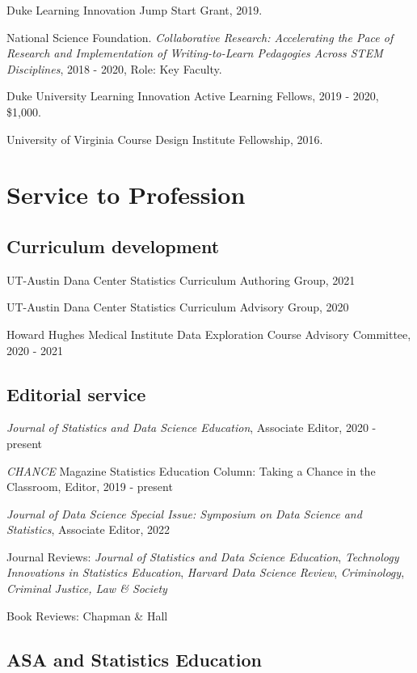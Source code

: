\documentclass[11pt,dvipsnames]{article}
\begin{document}
Duke Learning Innovation Jump Start Grant, 2019.

National Science Foundation. \emph{Collaborative Research: Accelerating
the Pace of Research and Implementation of Writing-to-Learn Pedagogies
Across STEM Disciplines}, 2018 - 2020, Role: Key Faculty.

Duke University Learning Innovation Active Learning Fellows, 2019 -
2020, \$1,000.

University of Virginia Course Design Institute Fellowship, 2016.

\section{Service to Profession}\label{service-to-profession}

\subsection{Curriculum development}\label{curriculum-development}

UT-Austin Dana Center Statistics Curriculum Authoring Group, 2021

UT-Austin Dana Center Statistics Curriculum Advisory Group, 2020

Howard Hughes Medical Institute Data Exploration Course Advisory
Committee, 2020 - 2021

\subsection{Editorial service}\label{editorial-service}

\emph{Journal of Statistics and Data Science Education}, Associate
Editor, 2020 - present

\emph{CHANCE} Magazine Statistics Education Column: Taking a Chance in
the Classroom, Editor, 2019 - present

\emph{Journal of Data Science Special Issue: Symposium on Data Science
and Statistics}, Associate Editor, 2022

Journal Reviews: \emph{Journal of Statistics and Data Science
Education}, \emph{Technology Innovations in Statistics Education},
\emph{Harvard Data Science Review}, \emph{Criminology}, \emph{Criminal
Justice, Law \& Society}

Book Reviews: Chapman \& Hall

\subsection{ASA and Statistics
Education}\label{asa-and-statistics-education}
\end{document}
